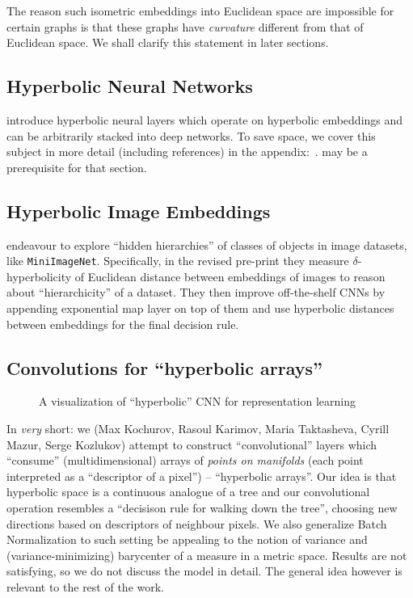 The reason such isometric embeddings into Euclidean space are impossible for
certain graphs is that these graphs have \emph{curvature} different from that
of Euclidean space. We shall clarify this statement in later sections.

\subsection*{Hyperbolic Neural Networks}

\citet{ganeaHNNs} introduce hyperbolic neural layers which operate on
hyperbolic embeddings and can be arbitrarily stacked into deep networks.  To
save space, we cover this subject in more detail (including references) in the
appendix:~.  may be
a prerequisite for that section.

\subsection{Hyperbolic Image Embeddings}

\citet{khrulkov} endeavour to explore ``hidden hierarchies'' of classes of
objects in image datasets, like \texttt{MiniImageNet}. Specifically, in the
revised pre-print they measure \( \delta \)-hyperbolicity of Euclidean distance
between embeddings of images to reason about ``hierarchicity'' of a dataset.
They then improve off-the-shelf CNNs by appending exponential map layer on top
of them and use hyperbolic distances between embeddings for the final
decision rule.

\subsection{Convolutions for ``hyperbolic arrays''} \label{appendix:hconv}

\begin{figure}[ht]\center
{}
\caption{A visualization of ``hyperbolic'' CNN for representation learning}
\end{figure}

In \emph{very} short: we (Max Kochurov, Rasoul Karimov, Maria Taktasheva,
Cyrill Mazur, Serge Kozlukov) attempt to construct ``convolutional'' layers
which ``consume'' (multidimensional) arrays of \emph{points on manifolds} (each
point interpreted as a ``descriptor of a pixel'') -- ``hyperbolic arrays''. Our
idea is that hyperbolic space is a continuous analogue of a tree and our
convolutional operation resembles a ``decisison rule for walking down the
tree'', choosing new directions based on descriptors of neighbour pixels. We
also generalize Batch Normalization to such setting be appealing to the notion
of variance and (variance-minimizing) barycenter of a measure in a metric
space. Results are not satisfying, so we do not discuss the model in detail.
The general idea however is relevant to the rest of the work.

